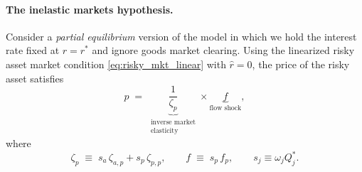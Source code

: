 

\paragraph{The inelastic markets hypothesis.}
Consider a \emph{partial equilibrium} version of the model in which we hold the interest rate fixed at $r=r^{*}$ and ignore goods market clearing.
Using the linearized risky asset market condition \eqref{eq:risky_mkt_linear} with $\hat r=0$, the price of the risky asset satisfies
\begin{equation}\label{eq:mkt-elasticity-pe}
    \hat{p}
    \;=\;
    \underbrace{\frac{1}{\zeta_p}}_{\substack{\text{inverse market}\\ \text{elasticity}}}
    \times
    \underbrace{f}_{\text{flow shock}},
\end{equation}
where
\[
\zeta_p \;\equiv\; s_a\,\zeta_{a,p} + s_p\,\zeta_{p,p},
\qquad
f \;\equiv\; s_p\,f_p,
\qquad
s_j \equiv \omega_j Q_j^{*}.
\]

